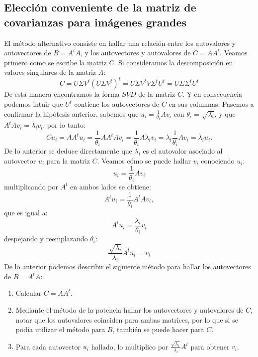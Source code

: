 \subsection{Elección conveniente de la matriz de covarianzas para imágenes grandes}

El método alternativo consiste en hallar una relación entre los autovalores y autovectores de $B = A^tA$, y los autovectores y autovalores de $C = A A^t$.
Veamos primero como se escribe la matriz $C$. Si consideramos la descomposición en valores singulares de la matriz $A$:
\begin{displaymath}
  C = U \Sigma V^t (U \Sigma V^t)^{t} = U \Sigma V^t V \Sigma^{t} U^{t}  = U \Sigma \Sigma^{t} U^{t}
\end{displaymath}
De esta manera encontramos la forma $SVD$ de la matriz $C$. Y en consecuencia podemos intuir que $U^t$ contiene los autovectores de $C$ en sus columnas.
Pasemos a confirmar la hipótesis anterior, sabemos que $u_{i} = \frac{1}{\theta_{i}}Av_{i}$ con $\theta_{i} = \sqrt{ \lambda_{i} }$, y que $A^{t} A v_{i} = \lambda_{i} v_{i}$, por lo tanto:
\begin{displaymath}
C u_{i} = A A^{t} u_{i} = \frac{1}{ \theta_{i} } A A^{t}  A v_{i} =  \frac{ 1 }{  \theta_{i} } A  \lambda_{i} v_{i} =  \lambda_{i} \frac{ 1 }{ \theta_{i} } A  v_{i} = \lambda_{i} u_{i}.
\end{displaymath}
De lo anterior se deduce directamente que $\lambda_{i}$ es el autovalor asociado al autovector $u_{i}$ para la matriz $C$.
Veamos cómo se puede hallar $v_{i}$ conociendo $u_{i}$:
\begin{displaymath}
  u_{i} = \frac{1}{ \theta_{i} } A v_{i}
\end{displaymath}
multiplicando por $A^{t}$ en ambos lados se obtiene:
\begin{displaymath}
  A^{t} u_{i} =  \frac{1}{ \theta_{i} } A^{t} A v_{i},  
\end{displaymath}
que es igual a: 
\begin{displaymath}
  A^{t} u_{i} = \frac{\lambda_{i}}{ \theta_{i} }  v_{i} 
\end{displaymath}
despejando y reemplazando $\theta_{i}$:
\begin{displaymath}
  \frac{ \sqrt{\lambda_{i} } }{ \lambda_{i} }  A^{t} u_{i} = v_{i}
\end{displaymath}
De lo anterior podemos describir el siguiente método para hallar los autovectores de $B = A^{t}A$:
\begin{enumerate}
\setlength{\itemindent}{0.2in}
\item Calcular $C = AA^{t}$.
\item Mediante el método de la potencia hallar los autovectores y autovalores de $C$, notar que los autovalores coinciden para ambas matrices, por lo que si  se podía utilizar el método para $B$, también se puede hacer para $C$.
\item Para cada autovector $u_{i}$ hallado, lo multiplico por $\frac{ \sqrt{\lambda_{i} } }{ \lambda_{i} }  A^{t}$ para obtener $v_{i}$.
\end{enumerate}


